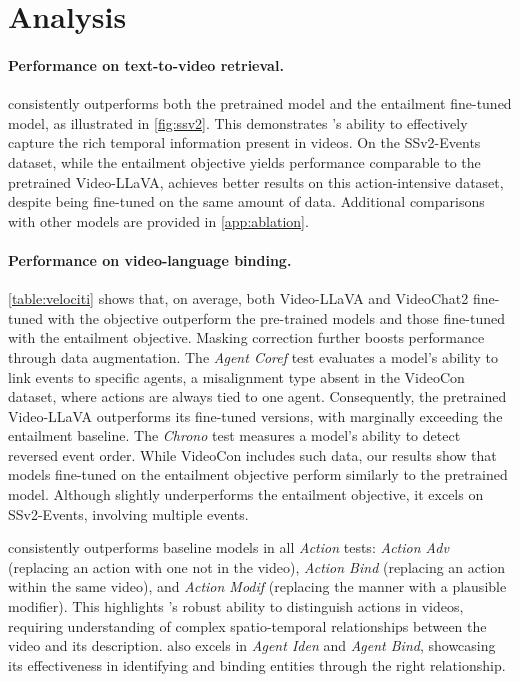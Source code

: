 \section{Analysis}
\label{sec:analysis}

\paragraph{Performance on text-to-video retrieval.} 
\method{} consistently outperforms both the pretrained model and the entailment fine-tuned model, as illustrated in \autoref{fig:ssv2}. This demonstrates \method{}'s ability to effectively capture the rich temporal information present in videos. On the SSv2-Events dataset, while the entailment objective yields performance comparable to the pretrained Video-LLaVA, \method{} achieves better results on this action-intensive dataset, despite being fine-tuned on the same amount of data.
Additional comparisons with other models are provided in \autoref{app:ablation}.

\paragraph{Performance on video-language binding.} 
\autoref{table:velociti} shows that, on average, both Video-LLaVA and VideoChat2 fine-tuned with the \method{} objective outperform the pre-trained models and those fine-tuned with the entailment objective. 
Masking correction further boosts performance through data augmentation.
The \textit{Agent Coref} test evaluates a model's ability to link events to specific agents, a misalignment type absent in the VideoCon dataset, where actions are always tied to one agent. Consequently, the pretrained Video-LLaVA outperforms its fine-tuned versions, with \method{} marginally exceeding the entailment baseline.
The \textit{Chrono} test measures a model's ability to detect reversed event order. While VideoCon includes such data, our results show that models fine-tuned on the entailment objective perform similarly to the pretrained model. Although \method{} slightly underperforms the entailment objective, it excels on SSv2-Events, involving multiple events.


\method{} consistently outperforms baseline models in all \textit{Action} tests: \textit{Action Adv} (replacing an action with one not in the video), \textit{Action Bind} (replacing an action within the same video), and \textit{Action Modif} (replacing the manner with a plausible modifier). 
This highlights \method{}'s robust ability to distinguish actions in videos, requiring understanding of complex spatio-temporal relationships between the video and its description.
\method{} also excels in \textit{Agent Iden}
and \textit{Agent Bind},
showcasing its effectiveness in identifying and binding entities through the right relationship.


